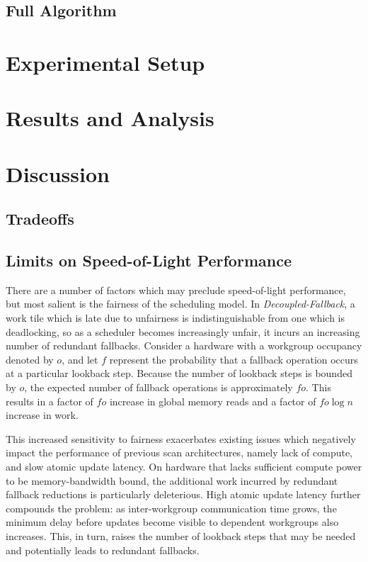 \documentclass[sigconf]{acmart}
\begin{document}
\subsection{Full Algorithm}

\section{Experimental Setup}

\section{Results and Analysis}

\section{Discussion}

\subsection{Tradeoffs}

\subsection{Limits on Speed-of-Light Performance}
There are a number of factors which may preclude speed-of-light performance, but most salient is the fairness of the scheduling model. In \emph{Decoupled-Fallback}, a work tile which is late due to unfairness is indistinguishable from one which is deadlocking, so as a scheduler becomes increasingly unfair, it incurs an increasing number of redundant fallbacks. Consider a hardware with a workgroup occupancy denoted by $o$, and let $f$ represent the probability that a fallback operation occurs at a particular lookback step. Because the number of lookback steps is bounded by $o$, the expected number of fallback operations is approximately $fo$. This results in a factor of $fo$ increase in global memory reads and a factor of $fo\log{n}$ increase in work.

This increased sensitivity to fairness exacerbates existing issues which negatively impact the performance of previous scan architectures, namely lack of compute, and slow atomic update latency. On hardware that lacks sufficient compute power to be memory-bandwidth bound, the additional work incurred by redundant fallback reductions is particularly deleterious. High atomic update latency further compounds the problem: as inter-workgroup communication time grows, the minimum delay before updates become visible to dependent workgroups also increases. This, in turn, raises the number of lookback steps that may be needed and potentially leads to redundant fallbacks.
\end{document}
